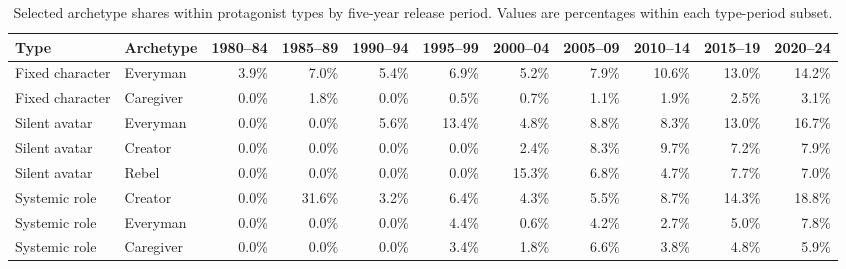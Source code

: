 \begin{table}[t]
\centering
\caption{Selected archetype shares within protagonist types by five-year release period. Values are percentages within each type-period subset.}
\label{tab:archetype_within_type_half_decades}
\tiny
\setlength{\tabcolsep}{2.5pt}
\renewcommand{\arraystretch}{1.05}
\begin{tabular}{llrrrrrrrrr}
\toprule
\textbf{Type} & \textbf{Archetype} & \textbf{1980--84} & \textbf{1985--89} & \textbf{1990--94} & \textbf{1995--99} & \textbf{2000--04} & \textbf{2005--09} & \textbf{2010--14} & \textbf{2015--19} & \textbf{2020--24} \\
\midrule
Fixed character & Everyman & 3.9\% & 7.0\% & 5.4\% & 6.9\% & 5.2\% & 7.9\% & 10.6\% & 13.0\% & 14.2\% \\
Fixed character & Caregiver & 0.0\% & 1.8\% & 0.0\% & 0.5\% & 0.7\% & 1.1\% & 1.9\% & 2.5\% & 3.1\% \\
Silent avatar & Everyman & 0.0\% & 0.0\% & 5.6\% & 13.4\% & 4.8\% & 8.8\% & 8.3\% & 13.0\% & 16.7\% \\
Silent avatar & Creator & 0.0\% & 0.0\% & 0.0\% & 0.0\% & 2.4\% & 8.3\% & 9.7\% & 7.2\% & 7.9\% \\
Silent avatar & Rebel & 0.0\% & 0.0\% & 0.0\% & 0.0\% & 15.3\% & 6.8\% & 4.7\% & 7.7\% & 7.0\% \\
Systemic role & Creator & 0.0\% & 31.6\% & 3.2\% & 6.4\% & 4.3\% & 5.5\% & 8.7\% & 14.3\% & 18.8\% \\
Systemic role & Everyman & 0.0\% & 0.0\% & 0.0\% & 4.4\% & 0.6\% & 4.2\% & 2.7\% & 5.0\% & 7.8\% \\
Systemic role & Caregiver & 0.0\% & 0.0\% & 0.0\% & 3.4\% & 1.8\% & 6.6\% & 3.8\% & 4.8\% & 5.9\% \\
\bottomrule
\end{tabular}
\end{table}
